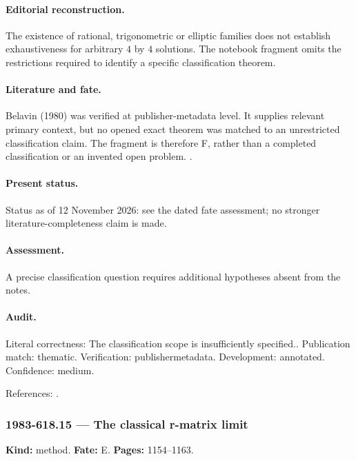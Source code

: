 \paragraph{Editorial reconstruction.} The existence of rational, trigonometric or elliptic families does not establish exhaustiveness for arbitrary $4$ by $4$ solutions. The notebook fragment omits the restrictions required to identify a specific classification theorem.

\paragraph{Literature and fate.} Belavin (1980) was verified at publisher-metadata level. It supplies relevant primary context, but no opened exact theorem was matched to an unrestricted classification claim. The fragment is therefore F, rather than a completed classification or an invented open problem. \citep{belavin1980discrete}.

\paragraph{Present status.} Status as of 12 November 2026: see the dated fate assessment; no stronger literature-completeness claim is made.

\paragraph{Assessment.} A precise classification question requires additional hypotheses absent from the notes.

\paragraph{Audit.} Literal correctness: The classification scope is insufficiently specified.. Publication match: thematic. Verification: publishermetadata. Development: annotated. Confidence: medium.

\noindent References: \citep{belavin1980discrete}.\par

\subsubsection{1983-618.15 --- The classical r-matrix limit}

\label{item:1983-618.15}

\noindent\textbf{Kind:} method. \textbf{Fate:} E. \textbf{Pages:} 1154--1163.\par


